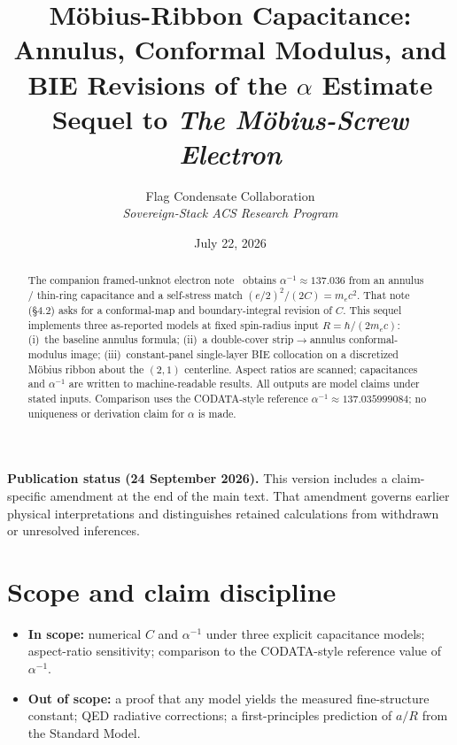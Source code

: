 \documentclass[11pt,a4paper]{article}
\title{\textbf{M\"obius-Ribbon Capacitance:\\
Annulus, Conformal Modulus, and BIE Revisions of the $\alpha$ Estimate}\\[0.35em]
\large Sequel to \textit{The M\"obius-Screw Electron}}
\author{Flag Condensate Collaboration\\
\small\textit{Sovereign-Stack ACS Research Program}}
\date{July 22, 2026}
\begin{document}
\maketitle

\begin{abstract}
The companion framed-unknot electron note~\cite{mobius2026} obtains
$\alpha^{-1}\approx 137.036$ from an annulus / thin-ring capacitance
and a self-stress match $(e/2)^2/(2C)=m_e c^2$.  That note
(\S4.2) asks for a conformal-map and boundary-integral revision of
$C$.  This sequel implements three as-reported models at fixed
spin-radius input $R=\hbar/(2m_e c)$: (i)~the baseline annulus
formula; (ii)~a double-cover strip$\to$annulus conformal-modulus
image; (iii)~constant-panel single-layer BIE collocation on a
discretized M\"obius ribbon about the $(2,1)$ centerline.  Aspect
ratios are scanned; capacitances and $\alpha^{-1}$ are written to
machine-readable results.  All outputs are model claims under stated
inputs.  Comparison uses the CODATA-style reference
$\alpha^{-1}\approx 137.035999084$; no uniqueness or derivation claim
for $\alpha$ is made.
\end{abstract}
\par\smallskip\noindent\textbf{Publication status (24 September 2026).}
This version includes a claim-specific amendment at the end of the main text.
That amendment governs earlier physical interpretations and distinguishes
retained calculations from withdrawn or unresolved inferences.\par\smallskip


\tableofcontents
\newpage

\section{Scope and claim discipline}
\label{sec:scope}

\begin{itemize}[leftmargin=1.3em,itemsep=2pt]
  \item \textbf{In scope:} numerical $C$ and $\alpha^{-1}$ under three
        explicit capacitance models; aspect-ratio sensitivity; comparison
        to the CODATA-style reference value of $\alpha^{-1}$.
  \item \textbf{Out of scope:} a proof that any model yields the measured
        fine-structure constant; QED radiative corrections; a first-principles
        prediction of $a/R$ from the Standard Model.
\end{itemize}
\end{document}
